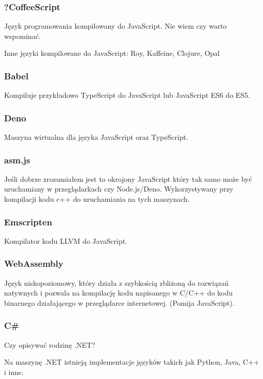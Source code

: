 \documentclass[a4paper]{article}
\begin{document}
\subsubsection{?CoffeeScript}
Język programowania kompilowany do JavaScript.
Nie wiem czy warto wspominać.

Inne języki kompilowane do JavaScript: Roy, Kaffeine, Clojure, Opal

\subsubsection{Babel}
Kompiluje przykładowo TypeScript do JavaScript lub JavaScript ES6 do ES5.

\subsubsection{Deno}
Maszyna wirtualna dla języka JavaScript oraz TypeScript.

\subsubsection{asm.js}
Jeśli dobrze zrozumiałem jest to okrojony JavaScript który tak samo może być uruchamiany w przeglądarkach czy Node.js/Deno.
Wykorzystywany przy kompilacji kodu c++ do uruchamiania na tych maszynach.

\subsubsection{Emscripten}
Kompilator kodu LLVM do JavaScript.

\subsubsection{WebAssembly}
Język niskopoziomowy, który działa z szybkością zbliżoną do rozwiązań natywnych i pozwala na kompilację kodu napisanego w C/C++ do kodu binarnego działającego w przeglądarce internetowej.
(Pomija JavaScript).

\subsubsection{C\#}
Czy opisywać rodzinę .NET?

Na maszynę .NET istnieją implementacje języków takich jak Python, Java, C++ i inne.
\end{document}
